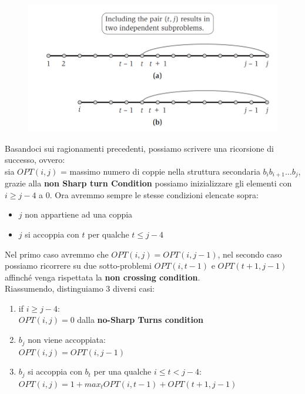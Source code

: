 \begin{figure}[H]
\centering
  \includegraphics[width=15cm, keepaspectratio]{Programmazione_dinamica/imgs/rna3.png}
  \centering
\end{figure}


Basandoci sui ragionamenti precedenti, possiamo scrivere
una ricorsione di successo, ovvero:\\

sia $OPT(i,j)$ = massimo numero di coppie nella
struttura secondaria $b_i b_{i+1} \ldots b_j$, grazie alla \textbf{non
  Sharp turn Condition} possiamo inizializzare gli elementi con
$i \geq j -4$ a $0$. Ora avremmo sempre le stesse condizioni
elencate sopra:
\begin{itemize}
  \item $j$ non appartiene ad una coppia
  \item $j$ si accoppia
        con $t$ per qualche $t \leq j - 4$
\end{itemize}

Nel primo caso avremmo che $OPT(i,j) = OPT(i, j-1)$, nel secondo caso
possiamo ricorrere su due sotto-problemi $OPT(i, t-1)$ e
$OPT(t+1, j-1)$ affinché venga rispettata la \textbf{non crossing
  condition}.\\

Riassumendo, distinguiamo 3 diversi casi:
\begin{enumerate}
  \item if $i \ge j -4$:\\
        $OPT(i,j) = 0$ dalla \textbf{no-Sharp Turns condition}
  \item $b_j$ non viene accoppiata:\\ $OPT(i,j) = OPT(i,j-1)$
  \item $b_j$ si accoppia con $b_t$ per una qualche $i \le t < j -4$:\\
        $OPT(i,j) = 1 + max_t{OPT(i, t-1) + OPT(t+1, j-1)}$
\end{enumerate}



